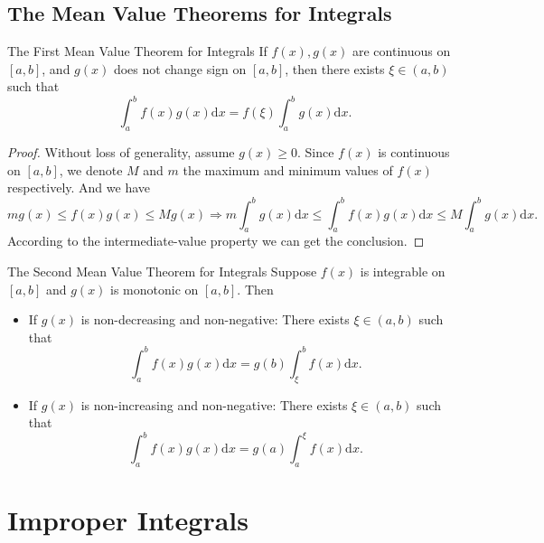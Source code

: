 \subsection{The Mean Value Theorems for Integrals}

\begin{theorem}{The First Mean Value Theorem for Integrals}{}
  If $f(x), g(x)$ are continuous on $[a, b]$,
  and $g(x)$ does not change sign on $[a, b]$,
  then there exists $\xi \in (a, b)$ such that
  \begin{equation}
    \int_a^b f(x) g(x) \mathrm{d} x = f(\xi) \int_a^b g(x) \mathrm{d} x.
  \end{equation}
\end{theorem}

\begin{proof}
  Without loss of generality,
  assume $g(x) \geq 0$. Since $f(x)$ is continuous on $[a, b]$,
  we denote $M$ and $m$ the maximum and minimum values of $f(x)$ respectively.
  And we have
  \begin{equation}
    m g(x) \leq f(x)g(x) \leq Mg(x) \Rightarrow
    m \int_a^b g(x)\mathrm{d} x \leq \int_a^b f(x)g(x)\mathrm{d} x \leq M \int_a^b g(x)\mathrm{d} x.
  \end{equation}
  According to the intermediate-value property we can get the conclusion.
\end{proof}

\begin{theorem}{The Second Mean Value Theorem for Integrals}{}
  Suppose $f(x)$ is integrable on $[a, b]$ and $g(x)$ is monotonic on $[a, b]$.
  Then 
  \begin{itemize}
  \item If $g(x)$ is non-decreasing and non-negative: There exists $\xi \in (a,
    b)$ such that
    \begin{equation}
      \int_a^b f(x) g(x) \mathrm{d} x = g(b) \int_{\xi}^b f(x) \mathrm{d} x.
    \end{equation}
  \item If $g(x)$ is non-increasing and non-negative: There exists $\xi \in (a,
    b)$ such that
    \begin{equation}
      \int_a^b f(x) g(x) \mathrm{d} x = g(a) \int_{a}^{\xi} f(x) \mathrm{d} x.
    \end{equation}
  \end{itemize}
\end{theorem}

\section{Improper Integrals}

